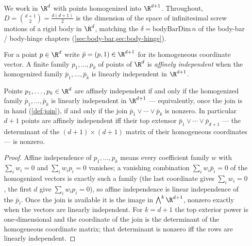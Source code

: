 We work in $\R^{d}$ with points homogenized into $\R^{d+1}$. Throughout,
$D = \binom{d+1}{2} = \tfrac{d(d+1)}{2}$ is the dimension of the space of
infinitesimal screw motions of a rigid body in $\R^{d}$, matching the
$\delta = \mathrm{bodyBarDim}\,n$ of the body-bar / body-hinge chapters
(\cref{sec:body-bar,sec:body-hinge}).

\begin{definition}
  \label{def:homogeneous-coords}
  \leanok
  For a point $p \in \R^{d}$ write $\bar p = (p, 1) \in \R^{d+1}$ for its
  homogeneous coordinate vector. A finite family $p_1, \dots, p_k$ of
  points of $\R^{d}$ is \emph{affinely independent} when the homogenized
  family $\bar p_1, \dots, \bar p_k$ is linearly independent in
  $\R^{d+1}$.
\end{definition}

\begin{lemma}
  \label{lem:affine-indep-iff}
  \leanok
  Points $p_1, \dots, p_k \in \R^{d}$ are affinely independent if and
  only if the homogenized family $\bar p_1, \dots, \bar p_k$ is linearly
  independent in $\R^{d+1}$ --- equivalently, once the join is in hand
  (\cref{def:join}), if and only if the join
  $\bar p_1 \vee \cdots \vee \bar p_k$ is nonzero. In particular $d+1$
  points are affinely independent iff their top extensor
  $\bar p_1 \vee \cdots \vee \bar p_{d+1}$ --- the determinant of the
  $(d+1)\times(d+1)$ matrix of their homogeneous coordinates --- is
  nonzero.
\end{lemma}
\begin{proof}
  \leanok
  Affine independence of $p_1, \dots, p_k$ means every coefficient
  family $w$ with $\sum_i w_i = 0$ and $\sum_i w_i p_i = 0$ vanishes; a
  vanishing combination $\sum_i w_i \bar p_i = 0$ of the homogenized
  vectors is exactly such a family (the last coordinate gives
  $\sum_i w_i = 0$, the first $d$ give $\sum_i w_i p_i = 0$), so affine
  independence is linear independence of the $\bar p_i$. Once the join is
  available it is the image in $\bigwedge^{k} \R^{d+1}$, nonzero exactly
  when the vectors are linearly independent. For $k = d+1$ the top
  exterior power is one-dimensional and the coordinate of the join is the
  determinant of the homogeneous coordinate matrix; that determinant is
  nonzero iff the rows are linearly independent.
\end{proof}

